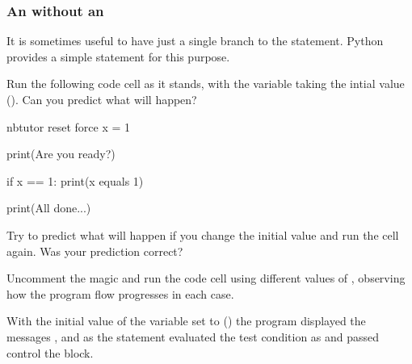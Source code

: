 \documentclass[letterpaper,10pt,english]{sphinxmanual}
\begin{document}
\subsubsection{An  without an }
\label{\detokenize{content/02_Robot_Lab/Section_00_02:An-if..-without-an-else...}}
It is sometimes useful to have just a single branch to the  statement. Python provides a simple  statement for this purpose.

Run the following code cell as it stands, with the  variable taking the intial value  (). Can you predict what will happen?

{
\begin{sphinxVerbatim}[commandchars=\\\{\}]
\llap{\color{nbsphinxin}[ ]:\,\hspace{\fboxrule}\hspace{\fboxsep}}\PYGZsh{}\PYGZpc{}\PYGZpc{}nbtutor \PYGZhy{}\PYGZhy{}reset \PYGZhy{}\PYGZhy{}force
x = 1

print(\PYGZdq{}Are you ready?\PYGZdq{})

if x == 1:
    print(\PYGZdq{}x equals 1\PYGZdq{})

print(\PYGZdq{}All done...\PYGZdq{})
\end{sphinxVerbatim}
}

Try to predict what will happen if you change the initial value and run the cell again. Was your prediction correct?

Uncomment the  magic and run the code cell using different values of , observing how the program flow progresses in each case.


With the initial value of the variable  set to  () the program displayed the messages ,  and  as the  statement evaluated the  test condition as  and passed control  the  block.
\end{document}
